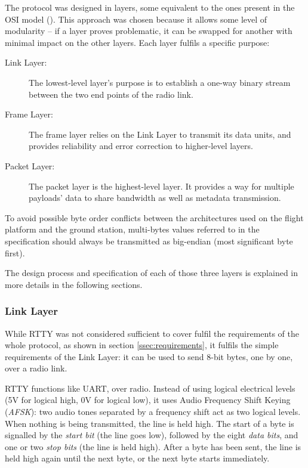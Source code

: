 The protocol was designed in layers, some equivalent to the ones present in the
OSI model (\cite{Stallings1987}). This approach was chosen because it allows
some level of modularity – if a layer proves problematic, it can be swapped
for another with minimal impact on the other layers. Each layer fulfils a
specific purpose:


\begin{description}
\item[Link Layer:] The lowest-level layer's purpose is to establish a one-way
binary stream between the two end points of the radio link.

\item[Frame Layer:] The frame layer relies on the Link Layer to transmit its
data units, and provides reliability and error correction to higher-level 
layers.

\item[Packet Layer:] The packet layer is the highest-level layer. It provides
a way for multiple payloads' data to share bandwidth as well as metadata
transmission.
\end{description}

To avoid possible byte order conflicts between the architectures used on the
flight platform and the ground station, multi-bytes values referred to in the
specification should always be transmitted as big-endian (most significant byte
first).

The design process and specification of each of those three layers is explained
in more details in the following sections.

\subsubsection{Link Layer}
\label{sssec:link-layer}


While RTTY was not considered sufficient to cover fulfil the requirements of
the whole protocol, as shown in section \ref{ssec:requirements}, it fulfils the
simple requirements of the Link Layer: it can be used to send 8-bit bytes, one
by one, over a radio link.

RTTY functions like UART, over radio. Instead of using logical electrical levels
(5V for logical high, 0V for logical low), it uses Audio Frequency Shift Keying
(\textit{AFSK}): two audio tones separated by a frequency shift act as two
logical levels. When nothing is being transmitted, the line is held high. The
start of a byte is signalled by the \textit{start bit} (the line goes low),
followed by the eight \textit{data bits}, and one or two \textit{stop bits} (the
line is held high). After a byte has been sent, the line is held high again
until the next byte, or the next byte starts immediately.

